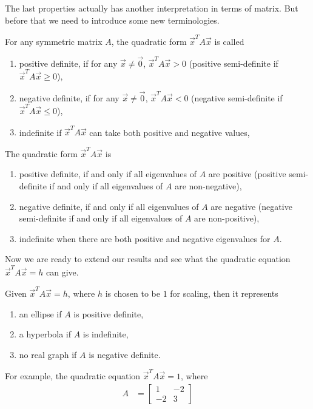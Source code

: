 The last properties actually has another interpretation in terms of matrix. But before that we need to introduce some new terminologies.
\begin{defn}
For any symmetric matrix $A$, the quadratic form $\vec{x}^T A\vec{x}$ is called
\begin{enumerate}[label=(\alph*)]
\item positive definite, if for any $\vec{x} \neq \vec{0}$, $\vec{x}^T A\vec{x} > 0$ (positive semi-definite if $\vec{x}^T A\vec{x} \geq 0$), 
\item negative definite, if for any $\vec{x} \neq \vec{0}$, $\vec{x}^T A\vec{x} < 0$ (negative semi-definite if $\vec{x}^T A\vec{x} \leq 0$), 
\item indefinite if $\vec{x}^T A\vec{x}$ can take both positive and negative values,
\end{enumerate}
\end{defn}
\begin{thm}
The quadratic form $\vec{x}^T A\vec{x}$ is
\begin{enumerate}[label=(\alph*)]
\item positive definite, if and only if all eigenvalues of $A$ are positive (positive semi-definite if and only if all eigenvalues of $A$ are non-negative), 
\item negative definite, if and only if all eigenvalues of $A$ are negative (negative semi-definite if and only if all eigenvalues of $A$ are non-positive), 
\item indefinite when there are both positive and negative eigenvalues for $A$.
\end{enumerate}
\end{thm}
Now we are ready to extend our results and see what the quadratic equation $\vec{x}^TA\vec{x} = h$ can give.
\begin{thm}
Given $\vec{x}^TA\vec{x} = h$, where $h$ is chosen to be $1$ for scaling, then it represents
\begin{enumerate}[label=(\alph*)]
\item an ellipse if $A$ is positive definite,
\item a hyperbola if $A$ is indefinite,
\item no real graph if $A$ is negative definite.
\end{enumerate}
\end{thm}
For example, the quadratic equation $\vec{x}^TA\vec{x} = 1$, where
\begin{align*}
A &=
\begin{bmatrix}
1 & -2 \\
-2 & 3
\end{bmatrix}
\end{align*}
